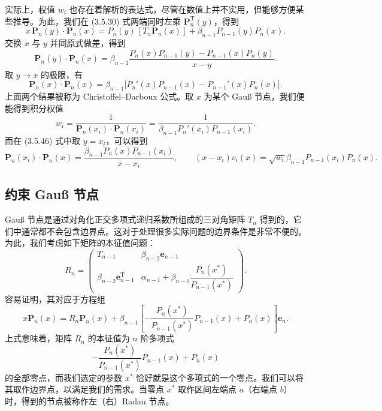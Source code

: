 实际上，权值 $w_i$ 也存在着解析的表达式，尽管在数值上并不实用，但能够方便某些推导。为此，我们在 (3.5.30) 式两端同时左乘 $\bm P_n^{\mathrm T}(y)$，得到
\begin{equation}
x\,\bm P_n(y)\cdot\bm P_n(x)
=P_n(y)\,[T_n\bm P_n(x)]+\beta_{n-1}P_{n-1}(y)P_n(x).
\tag{3.5.45}
\end{equation}
交换 $x$ 与 $y$ 并同原式做差，得到
\begin{equation}
\bm P_n(y)\cdot\bm P_n(x)
=\beta_{n-1}\frac{P_n(x)P_{n-1}(y)-P_{n-1}(x)P_n(y)}{x-y}.
\tag{3.5.46}
\end{equation}
取 $y\to x$ 的极限，有
\begin{equation}
\bm P_n(x)\cdot\bm P_n(x)
=\beta_{n-1}\bigl[P_n'(x)P_{n-1}(x)-P_{n-1}'(x)P_n(x)\bigr].
\tag{3.5.47}
\end{equation}
上面两个结果被称为 Christoffel--Darboux 公式。取 $x$ 为某个 Gauß 节点，我们便能得到积分权值
\begin{equation}
w_i=\frac1{\bm P_n(x_i)\cdot\bm P_n(x_i)}
=\frac1{\beta_{n-1}P_n'(x_i)P_{n-1}(x_i)}.
\tag{3.5.48}
\end{equation}
而在 (3.5.46) 式中取 $y=x_i$，可以得到
\begin{equation}
\bm P_n(x_i)\cdot\bm P_n(x)
=\frac{\beta_{n-1}P_n(x)P_{n-1}(x_i)}{x-x_i},
\qquad
(x-x_i)v_i(x)=\sqrt{w_i}\beta_{n-1}P_{n-1}(x_i)P_n(x).
\tag{3.5.49}
\end{equation}

\subsection{约束 Gauß 节点}

Gauß 节点是通过对角化正交多项式递归系数所组成的三对角矩阵 $T_n$ 得到的，它们中通常都不会包含边界点。这对于处理很多实际问题的边界条件是非常不便的。为此，我们考虑如下矩阵的本征值问题：
\begin{equation}
R_n=
\begin{pmatrix}
T_{n-1}&\beta_{n-2}\bm e_{n-1}\\
\beta_{n-2}\bm e_{n-1}^{\mathrm T}&\alpha_{n-1}+\beta_{n-1}\dfrac{P_n(x^*)}{P_{n-1}(x^*)}
\end{pmatrix}.
\tag{3.5.50}
\end{equation}
容易证明，其对应于方程组
\begin{equation}
x\bm P_n(x)=R_n\bm P_n(x)+\beta_{n-1}
\left[-\frac{P_n(x^*)}{P_{n-1}(x^*)}P_{n-1}(x)+P_n(x)\right]\bm e_n.
\tag{3.5.51}
\end{equation}
上式意味着，矩阵 $R_n$ 的本征值为 $n$ 阶多项式
\[
-\frac{P_n(x^*)}{P_{n-1}(x^*)}P_{n-1}(x)+P_n(x)
\]
的全部零点，而我们选定的参数 $x^*$ 恰好就是这个多项式的一个零点。我们可以将其取作边界点，以满足我们的需求。当零点 $x^*$ 取作区间左端点 $a$（右端点 $b$）时，得到的节点被称作左（右）Radau 节点。

